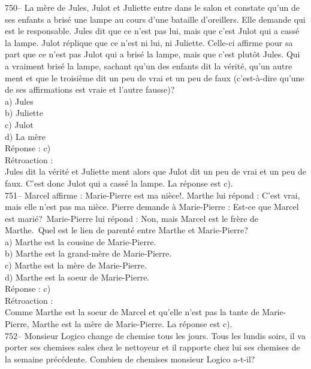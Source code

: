 ﻿\documentclass[letterpaper, 12pt]{article}
\begin{document}
750-- La m\`ere de Jules, Julot et Juliette entre dans le salon et constate
qu'un de ses enfants a bris\'e une lampe au cours d'une bataille
d'oreillers.  Elle demande qui est le responsable. Jules dit que ce n'est
pas lui, mais que c'est Julot qui a cass\'e la lampe.  Julot r\'eplique que
ce n'est ni lui, ni Juliette.  Celle-ci affirme pour sa part que ce n'est
pas Julot qui a bris\'e la lampe, mais que c'est plut\^ot Jules.  Qui a
vraiment bris\'e la lampe, sachant qu'un des enfants dit la v\'erit\'e,
qu'un autre ment et que le troisi\`eme dit un peu de vrai et un peu de faux
(c'est-\`a-dire qu'une de ses affirmations est vraie et l'autre fausse)?\\
a) Jules\\
b) Juliette\\
c) Julot\\
d) La m\`ere\\

R\'eponse : c)\\

R\'etroaction : \\
Jules dit la v\'erit\'e et Juliette ment alors que Julot dit un peu de vrai
et un peu de faux.  C'est donc Julot qui a cass\'e la lampe. La r\'eponse
est c).\\

751-- Marcel affirme : \og Marie-Pierre est ma ni\`ece!\fg .  Marthe
lui r\'epond : \og C'est vrai, mais elle n'est pas ma ni\`ece\fg .
Pierre demande \`a Marie-Pierre : \og Est-ce que Marcel est
mari\'e?\fg\ Marie-Pierre lui r\'epond : \og Non, mais Marcel est le
fr\`ere de Marthe.\fg\  Quel est le lien de parent\'e
entre Marthe et Marie-Pierre?\\
a) Marthe est la cousine de Marie-Pierre.\\
b) Marthe est la grand-m\`ere de Marie-Pierre.\\
c) Marthe est la m\`ere de Marie-Pierre.\\
d) Marthe est la soeur de Marie-Pierre.\\

R\'eponse : c)\\

R\'etroaction : \\
Comme Marthe est la soeur de Marcel et qu'elle n'est pas la tante de
Marie-Pierre, Marthe est la m\`ere de Marie-Pierre.  La r\'eponse est c).\\

752-- Monsieur Logico change de chemise tous les jours.  Tous les lundis
soirs, il va porter ses chemises sales chez le nettoyeur et il rapporte chez
lui ses chemises de la semaine pr\'ec\'edente.  Combien de chemises monsieur
Logico a-t-il?\\
\end{document}
